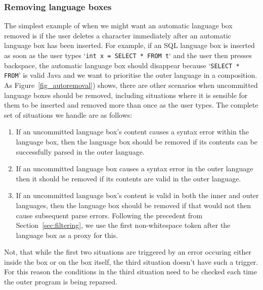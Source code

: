 \documentclass[sigplan,screen]{acmart}\settopmatter{printfolios=true,printccs=false,printacmref=false}
\begin{document}
\subsubsection{Removing language boxes}

The simplest example of when we might want an automatic language box removed is if
the user deletes a character immediately after an automatic language box has
been inserted. For example, if an SQL language box is inserted as soon as the
user types `\texttt{int x = SELECT * FROM t}` and the user then presses
backspace, the automatic language box should disappear because `\texttt{SELECT
* FROM}' is valid Java and we want to prioritise the outer language in a
composition. As Figure~\ref{fig_autoremoval}) shows, there are other scenarios
when uncommitted language boxes should be removed, including situations where
it is sensible for them to be inserted and removed more than once as the user
types. The complete set of situations we handle are as follows:

\begin{enumerate}
  \item If an uncommitted language box's content causes a syntax error within
    the language box, then the language box should be removed if its contents
    can be successfully parsed in the outer language.
  \item If an uncommitted language box causes a syntax error in the outer
    language then it should be removed if its contents are valid in the
    outer language.
  \item If an uncommitted language box's content is valid in both the inner and
    outer languages, then the language box should be removed if that would not
    then cause subsequent parse errors. Following the precedent from
    Section~\ref{sec:filtering}, we use the first non-whitespace token after
    the language box as a proxy for this.
\end{enumerate}

Not, that while the first two situations are triggered by an error occuring either inside
the box or on the box itself, the third situation doesn't have such a trigger.
For this reason the conditions in the third situation need to be checked each time the
outer program is being reparsed.
\end{document}
